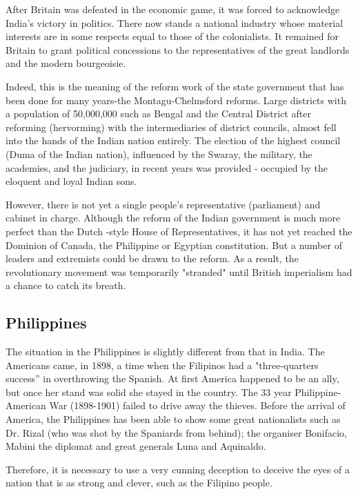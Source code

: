 After Britain was defeated in the economic game, it was forced to acknowledge 
India's victory in politics. There now stands a national industry whose material 
interests are in some respects equal to those of the colonialists. It remained for 
Britain to grant political concessions to the representatives of the great landlords and the modern bourgeoisie.\vskip 0.2in

Indeed, this is the meaning of the reform work of the state government that has been 
done for many years-the Montagu-Chelmsford reforms. Large districts with a population 
of 50,000,000 such as Bengal and the Central District after reforming (hervorming) 
with the intermediaries of district councils, almost fell into the hands of the Indian 
nation entirely. The election of the highest council (Duma of the Indian nation), 
influenced by the Swaray, the military, the academies, and the judiciary, in recent 
years was provided - occupied by the eloquent and loyal Indian sons.\vskip 0.2in

However, there is not yet a single people's representative (parliament) 
and cabinet in charge. Although the reform of the Indian government is much 
more perfect than the Dutch -style House of Representatives, it has not yet 
reached the Dominion of Canada, the Philippine or Egyptian constitution. But a 
number of leaders and extremists could be drawn to the reform. As a result, the 
revolutionary movement was temporarily "stranded" until British imperialism had a chance to catch its breath.\vskip 0.2in

\subsection{Philippines}

The situation in the Philippines is slightly different from that in India. 
The Americans came, in 1898, a time when the Filipinos had a "three-quarters success” 
in overthrowing the Spanish. At first America happened to be an ally, but once her stand 
was solid she stayed in the country. The 33 year Philippine-American War (1898-1901) 
failed to drive away the thieves. Before the arrival of America, the Philippines has 
been able to show some great nationalists such as Dr. Rizal (who was shot by the Spaniards from behind); 
the organiser Bonifacio, Mabini the diplomat and great generals Luna and Aquinaldo.\vskip 0.2in

Therefore, it is necessary to use a very cunning deception to deceive the eyes of a 
nation that is as strong and clever, such as the Filipino people.\vskip 0.2in

